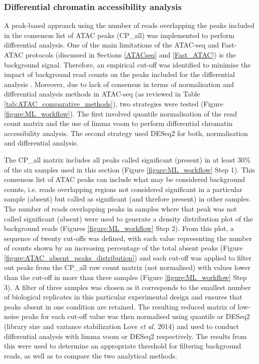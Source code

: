 

\subsubsection{Differential chromatin accessibility analysis}

A peak-based approach using the number of reads overlapping the peaks included in the consensus list of ATAC peaks (CP\_all) was implemented to perform differential analysis. One of the main limitations of the ATAC-seq and Fast-ATAC protocols (discussed in Sections \ref{ATACseq} and \ref{Fast_ATAC}) is the background signal. Therefore, an empirical cut-off was identified to minimise the impact of background read counts on the peaks included for the differential analysis \parencite{Xinmin2005,Jonker2014}. Moreover, due to lack of consensus in terms of normalisation and differential analysis methods in ATAC-seq (as reviewed in Table \ref{tab:ATAC_comparative_methods}), two strategies were tested (Figure \ref{figure:ML_workflow}). The first involved quantile normalisation of the read count matrix and the use of limma voom to perform differential chromatin accessibility analysis. The second strategy used DESeq2 for both, normalisation and differential analysis.

The CP\_all matrix includes all peaks called significant (present) in at least 30\% of the six samples used in this section (Figure \ref{figure:ML_workflow} Step 1). This consensus list of ATAC peaks can include what may be considered background counts, i.e. reads overlapping regions not considered significant in a particular sample (absent) but called as significant (and threfore present) in other samples. The number of reads overlapping peaks in samples where that peak was not called significant (absent) were used to generate a density distribution plot of the background reads (Figures \ref{figure:ML_workflow} Step 2). From this plot, a sequence of twenty cut-offs was defined, with each value representing the number of counts shown by an increasing percentage of the total absent peaks (Figure \ref{figure:ATAC_absent_peaks_distribution}) and each cut-off was applied to filter out peaks from the CP\_all raw count matrix (not normalised) with values lower than the cut-off in more than three samples (Figure \ref{figure:ML_workflow} Step 3). A filter of three samples was chosen as it corresponds to the smallest number of biological replicates in this particular experimental design and ensures that peaks absent in one condition are retained. The resulting reduced matrix of low-noise peaks for each cut-off value was then normalised using quantile or DESeq2 (library size and variance stabilization Love \textit{et al.} 2014) and used to conduct differential analysis with limma voom or DESeq2 respectively. The results from this were used to determine an appropriate threshold for filtering background reads, as well as to compare the two analytical methods. 


